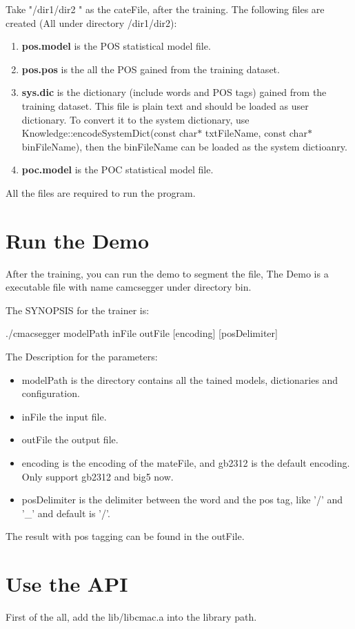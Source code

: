 Take "/dir1/dir2 " as the cateFile, after the training. The following files are created (All under directory /dir1/dir2): \begin{enumerate}
\item {\bf pos.model} is the POS statistical model file. \item {\bf pos.pos} is the all the POS gained from the training dataset. \item {\bf sys.dic} is the dictionary (include words and POS tags) gained from the training dataset. This file is plain text and should be loaded as user dictionary. To convert it to the system dictionary, use Knowledge::encodeSystemDict(const char$\ast$ txtFileName, const char$\ast$ binFileName), then the binFileName can be loaded as the system dictioanry. \item {\bf poc.model} is the POC statistical model file. \end{enumerate}


All the files are required to run the program.\par
\section{Run the Demo}\label{index_rundemo}
After the training, you can run the demo to segment the file, The Demo is a executable file with name camcsegger under directory bin.

The SYNOPSIS for the trainer is: \par
 ./cmacsegger modelPath inFile outFile [encoding] [posDelimiter] \par


\par
The Description for the parameters: \begin{itemize}
\item modelPath is the directory contains all the tained models, dictionaries and configuration.  \item inFile the input file. \item outFile the output file. \item encoding is the encoding of the mateFile, and gb2312 is the default encoding. Only support gb2312 and big5 now. \item posDelimiter is the delimiter between the word and the pos tag, like '/' and '\_\-' and default is '/'. \end{itemize}


The result with pos tagging can be found in the outFile.\section{Use the API}\label{index_useapi}
First of the all, add the lib/libcmac.a into the library path.

